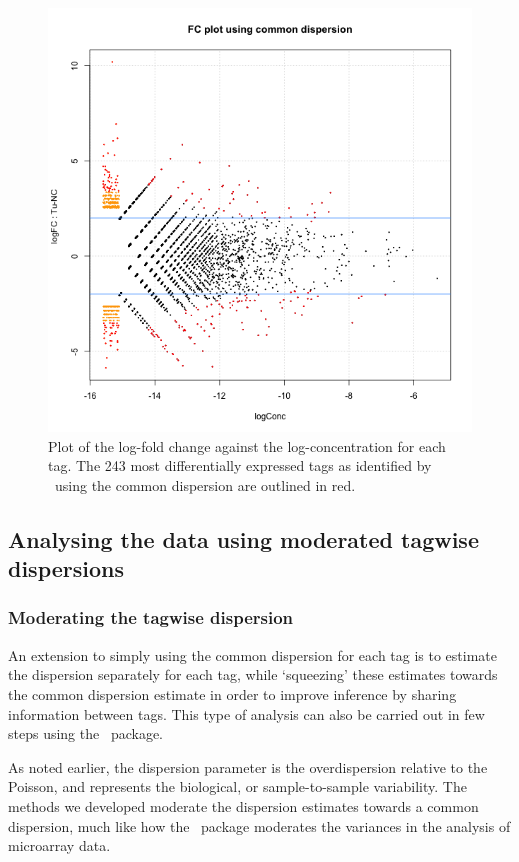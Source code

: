 \begin{figure}[ht]
\begin{center}
\includegraphics[height=0.45\textheight]{edgeR_case_study_Zhang-015.png}
\caption{Plot of the log-fold change against the log-concentration for
  each tag. The 243 most differentially expressed tags as identified
  by \edgeR~using the common dispersion are outlined in red.}
\label{fig:Zhang_FC1}
\end{center}
\end{figure}


\subsection{Analysing the data using moderated tagwise dispersions}
\subsubsection{Moderating the tagwise dispersion}
An extension to simply using the common dispersion for each tag is to
estimate the dispersion separately for each tag, while `squeezing'
these estimates towards the common dispersion estimate in order to
improve inference by sharing information between tags. This type of
analysis can also be carried out in few steps using the
\edgeR~package.

As noted earlier, the dispersion parameter is the overdispersion
relative to the Poisson, and represents the biological, or
sample-to-sample variability. The methods we developed moderate the
dispersion estimates towards a common dispersion, much like how the
\limma~package moderates the variances in the analysis of microarray
data.

